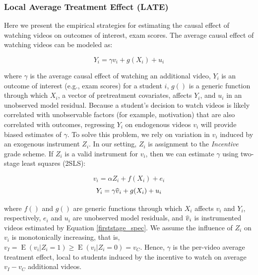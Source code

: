 \documentclass[12pt]{article}
\newcommand\wh[1]{\hstretch{2}{\hat{\hstretch{.5}{#1}}}}
\begin{document}
\subsubsection{Local Average Treatment Effect (LATE)}

Here we present the empirical strategies for estimating the causal effect of watching videos on outcomes of interest, exam scores. The average causal effect of watching videos can be modeled as:

\begin{equation} \label{endog_spec}
	Y_i = \gamma v_i + g(X_i) + u_i
\end{equation}

where $\gamma$ is the average causal effect of watching an additional video, $Y_i$ is an outcome of interest (e.g., exam scores) for a student $i$, $g()$ is a generic function through which $X_i$, a vector of pretreatment covariates, affects $Y_i$, and $u_i$ in an unobserved model residual. Because a student's decision to watch videos is likely correlated with unobservable factors (for example, motivation) that are also correlated with outcomes, regressing $Y_i$ on endogenous videos $v_i$ will provide biased estimates of $\gamma$. To solve this problem, we rely on variation in $v_i$ induced by an exogenous instrument $Z_i$. In our setting, $Z_i$ is assignment to the \textit{Incentive} grade scheme. If $Z_i$ is a valid instrument for $v_i$, then we can estimate $\gamma$ using two-stage least squares (2SLS):

\begin{equation} \label{firststage_spec}
	v_i = \alpha Z_i + f(X_i) + e_i
\end{equation}
\begin{equation} \label{secondstage_spec}
	Y_i = \gamma \wh{v}_i + g(X_i) + u_i
\end{equation}

where $f()$ and $g()$ are generic functions through which $X_i$ affects $v_i$ and $Y_i$, respectively, $e_i$ and $u_i$ are unobserved model residuals, and $\wh{v}_i$ is instrumented videos estimated by Equation \ref{firststage_spec}. We assume the influence of $Z_i$ on $v_i$ is monotonically increasing, that is, $v_I = \operatorname{E}(v_i|Z_i=1) \geq \operatorname{E}(v_i|Z_i=0) = v_C$. Hence, $\gamma$ is the per-video average treatment effect, local to students induced by the incentive to watch on average $v_I - v_C$ additional videos.
\end{document}
